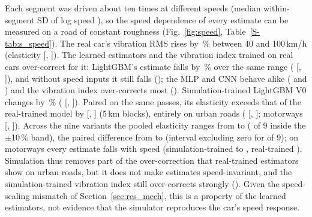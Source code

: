 Each segment was driven about ten times at different speeds (median within-segment SD of log speed \elSdLogv), so the speed dependence of every estimate can be measured on a road of constant roughness (Fig.~\ref{fig:speed}, Table~\ref{S-tab:s_speed}).
The real car's vibration RMS rises by \elRawPooledPct\,\% between 40 and 100\,km/h (elasticity \elRawPooled{} [\elRawPooledLo, \elRawPooledHi]).
The learned estimators and the vibration index trained on real cars over-correct for it: LightGBM's estimate falls by \elRealGbmPooledPct\,\% over the same range (\elRealGbmPooled{} [\elRealGbmPooledLo, \elRealGbmPooledHi]), and without speed inputs it still falls (\elRealGbmNoSpeedPooled); the MLP and CNN behave alike (\elRealMlpPooled{} and \elRealCnnPooled) and the vibration index over-corrects most (\elRealIdxPooled).
Simulation-trained LightGBM V0 changes by \elSimGbmPooledPct\,\% (\elSimGbmPooled{} [\elSimGbmPooledLo, \elSimGbmPooledHi]).
Paired on the same passes, its elasticity exceeds that of the real-trained model by \epVzeroPooled{} [\epVzeroPooledLo, \epVzeroPooledHi] (5\,km blocks), entirely on urban roads (\epVzeroUrban{} [\epVzeroUrbanLo, \epVzeroUrbanHi]; motorways \epVzeroMotorway{} [\epVzeroMotorwayLo, \epVzeroMotorwayHi]).
Across the nine variants the pooled elasticity ranges from \elSimGbmMeasPooledMin{} to \elSimGbmMeasPooledMax{} (\elSimGbmMeasInside{} of 9 inside the $\pm$10\,\% band), the paired difference from \epMeasPooledMin{} to \epMeasPooledMax{} (interval excluding zero for \epMeasPooledExcl{} of 9); on motorways every estimate falls with speed (simulation-trained \elSimGbmMeasMotorwayMin{} to \elSimGbmMeasMotorwayMax, real-trained \elRealGbmMotorway).
Simulation thus removes part of the over-correction that real-trained estimators show on urban roads, but it does not make estimates speed-invariant, and the simulation-trained vibration index still over-corrects strongly (\elSimIdxPooled).
Given the speed-scaling mismatch of Section~\ref{sec:res_mech}, this is a property of the learned estimators, not evidence that the simulator reproduces the car's speed response.

